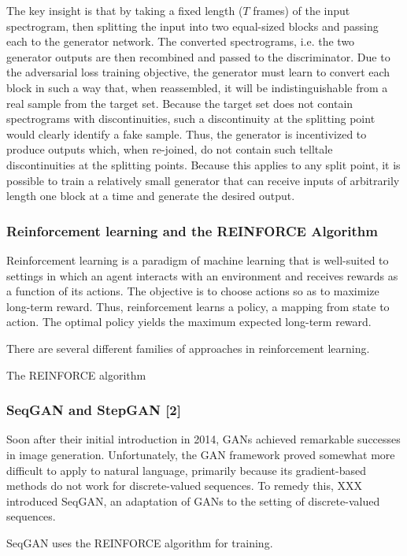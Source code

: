 The key insight is that by taking a fixed length ($T$ frames) of the input spectrogram, 
then splitting the input into two equal-sized blocks and passing each to the generator network. 
The converted spectrograms, i.e. the two generator outputs are then recombined and passed 
to the discriminator. Due to the adversarial loss training objective, the generator must learn 
to convert each block in such a way that, when reassembled, it will be indistinguishable from 
a real sample from the target set. Because the target set does not contain spectrograms with 
discontinuities, such a discontinuity at the splitting point would clearly identify a fake sample. 
Thus, the generator is incentivized to produce outputs which, when re-joined, do not contain 
such telltale discontinuities at the splitting points. Because this applies to any  split point, 
it is possible to train a relatively small generator that can receive inputs of arbitrarily length 
one block at a time and generate the desired output.

\iffalse
\subsubsection{Reinforcement learning and the REINFORCE Algorithm}
Reinforcement learning is a paradigm of machine learning that is well-suited to settings in which an agent 
interacts with an environment and receives rewards as a function of its actions. The objective is to 
choose actions so as to maximize long-term reward. Thus, reinforcement learns a policy, a mapping from 
state to action. The optimal policy yields the maximum expected long-term reward.

There are several different families of approaches in reinforcement learning. 

The REINFORCE algorithm  

\subsubsection{SeqGAN and StepGAN [2]}
Soon after their initial introduction in 2014, GANs achieved remarkable successes in image generation. 
Unfortunately, the GAN framework proved somewhat more difficult to apply to natural language, primarily 
because its gradient-based methods do not work for discrete-valued sequences. To remedy this, 
XXX introduced SeqGAN, an adaptation of GANs to the setting of discrete-valued sequences.

SeqGAN uses the REINFORCE algorithm for training. 

